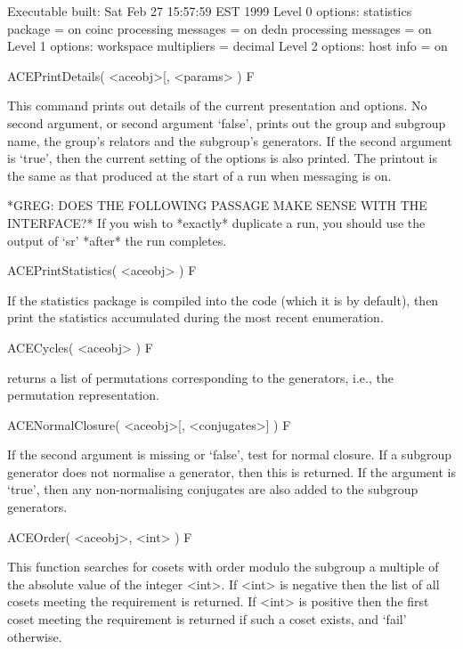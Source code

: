 \begintt
Executable built:
  Sat Feb 27 15:57:59 EST 1999
Level 0 options:
  statistics package = on
  coinc processing messages = on
  dedn processing messages = on
Level 1 options:
  workspace multipliers = decimal
Level 2 options:
  host info = on
\endtt


\>ACEPrintDetails( <aceobj>[, <params> ) F

This  command  prints out  details  of  the  current presentation  and
options.  No second argument, or second argument `false', prints out
the group
and subgroup name, the group's relators and the subgroup's generators.
If the second argument is `true', then  the current setting of the
options is
also printed.  The printout is the  same as that produced at the start
of a run when messaging is on.


*GREG: DOES THE FOLLOWING PASSAGE MAKE SENSE WITH THE INTERFACE?*
If you wish to *exactly* duplicate a run, you should use the output
of `sr' *after* the run completes.


\>ACEPrintStatistics( <aceobj> ) F

If the statistics package is compiled into the code (which it is by
default),
then print the statistics accumulated during the most recent enumeration.



\>ACECycles( <aceobj> ) F

returns a list of permutations corresponding to the generators,
i.e., the permutation representation.

\>ACENormalClosure( <aceobj>[, <conjugates>] ) F

If the second argument is missing or `false', test for normal closure.
If a subgroup  generator  does not  normalise  a  generator,  then this  is
returned.
If  the  argument  is `true',  then  any  non-normalising
conjugates are also added to the subgroup generators.

\>ACEOrder( <aceobj>, <int> ) F

This function searches for cosets with order modulo the subgroup a multiple
of the absolute value of the integer <int>.
If <int> is negative then the list of all cosets meeting the requirement is
returned.
If <int> is positive then the first coset meeting the requirement is
returned if such a coset exists, and `fail' otherwise.

